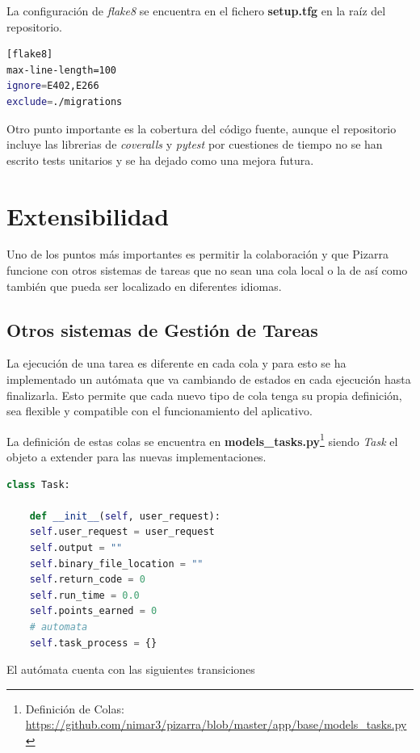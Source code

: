 \documentclass[11pt,spanish,listoffigures,listoftables]{tfgetsinf}
\begin{document}
La configuración de \textit{flake8} se encuentra en el fichero \textbf{setup.tfg} en la raíz del repositorio.

\begin{lstlisting}[language=bash]
[flake8]
max-line-length=100
ignore=E402,E266
exclude=./migrations
\end{lstlisting}

Otro punto importante es la cobertura del código fuente, aunque el repositorio incluye las librerias de \textit{coveralls} y \textit{pytest} por cuestiones de tiempo no se han escrito tests unitarios y se ha dejado como una mejora futura.

\chapter{Extensibilidad}

Uno de los puntos más importantes es permitir la colaboración y que Pizarra funcione con otros sistemas de tareas que no sean una \Gls{cola} local o la de \kahan así como también que pueda ser localizado en diferentes idiomas.

\section{Otros sistemas de Gestión de Tareas}

La ejecución de una tarea es diferente en cada \Gls{cola} y para esto se ha implementado un autómata que va cambiando de estados en cada ejecución hasta finalizarla. Esto permite que cada nuevo tipo de \Gls{cola} tenga su propia definición, sea flexible y compatible con el funcionamiento del aplicativo.

La definición de estas \Gls{cola}s se encuentra en \textbf{models\_tasks.py}\footnote{Definición de Colas: \url{https://github.com/nimar3/pizarra/blob/master/app/base/models_tasks.py}} siendo \textit{Task} el objeto a extender para las nuevas implementaciones.

\begin{lstlisting}[language=python]
class Task:

	def __init__(self, user_request):
	self.user_request = user_request
	self.output = ""
	self.binary_file_location = ""
	self.return_code = 0
	self.run_time = 0.0
	self.points_earned = 0
	# automata
	self.task_process = {}
\end{lstlisting}

El autómata cuenta con las siguientes transiciones
\end{document}
